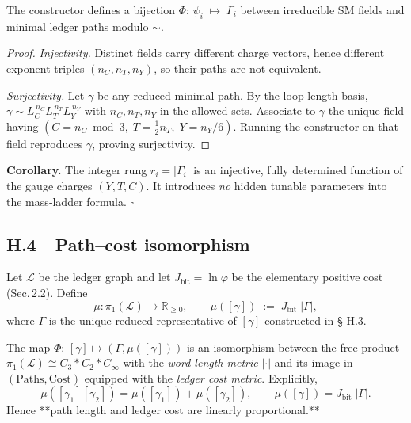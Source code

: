 \begin{theorem}
The constructor defines a bijection
\(
  \Phi:\,
  \psi_i \;\longmapsto\; \Gamma_i
\)
between irreducible SM fields and minimal ledger paths
modulo $\sim$.
\end{theorem}

\begin{proof}
\emph{Injectivity.}  
Distinct fields carry different charge vectors, hence
different exponent triples $(n_C,n_T,n_Y)$, so their
paths are not equivalent.

\emph{Surjectivity.}  
Let $\gamma$ be any reduced minimal path.
By the loop‑length basis,
$\gamma\!\sim\!L_C^{\,n_C}L_T^{\,n_T}L_Y^{\,n_Y}$ with
$n_C,n_T,n_Y$ in the allowed sets.
Associate to $\gamma$ the unique field having
$(C=n_C\bmod3,\;T=\tfrac12 n_T,\;Y=n_Y/6)$.
Running the constructor on that field reproduces
$\gamma$, proving surjectivity.
\end{proof}

\bigskip
\noindent
\textbf{Corollary.}\;
The integer rung
$r_i=|\Gamma_i|$ is an injective, fully determined
function of the gauge charges $(Y,T,C)$.
It introduces \emph{no} hidden tunable
parameters into the mass‑ladder formula.
\hfill$\square$

\subsection*{H.4  Path–cost isomorphism}
\begin{definition}\label{def:measure}
Let $\mathscr L$ be the ledger graph and let
$J_{\text{bit}}=\ln\varphi$ be the elementary positive cost
(Sec.\,2.2).  Define
\[
  \mu:\pi_1(\mathscr L)\longrightarrow\mathbb R_{\ge0},
  \qquad
  \mu([\gamma])\;:=\;J_{\text{bit}}\;\bigl|\Gamma\bigr|,
\]
where $\Gamma$ is the unique reduced representative of $[\gamma]$
constructed in § H.3.
\end{definition}

\begin{theorem}\label{thm:isom}
The map
\(
  \Phi:\,[\gamma]\mapsto(\Gamma,\mu([\gamma]))
\)
is an isomorphism between the free product
$\pi_1(\mathscr L)\cong C_3\!*C_2\!*C_\infty$
with the \emph{word‑length metric} $|\cdot|$
and its image in
$(\text{Paths},\text{Cost})$
equipped with the \emph{ledger cost metric}.  
Explicitly,
\[
  \mu([\gamma_1][\gamma_2])
   = \mu([\gamma_1])+\mu([\gamma_2]),
  \qquad
  \mu([\gamma]) = J_{\text{bit}}\;|\Gamma|.
\]
Hence **path length and ledger cost are linearly proportional.**
\end{theorem}

